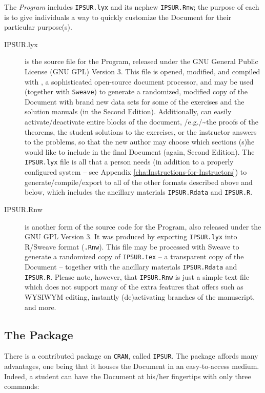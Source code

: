 \documentclass[captions=tableheading]{scrbook}
\begin{document}
The \emph{Program} includes \texttt{IPSUR.lyx} and its nephew \texttt{IPSUR.Rnw}; the purpose of each is to give individuals a way to quickly customize the Document for their particular purpose(s).


\begin{description}
\item[IPSUR.lyx] is the source \LyX{} file for the Program, released under the GNU General Public License (GNU GPL) Version 3. This file is opened, modified, and compiled with \LyX{}, a sophisticated open-source document processor, and may be used (together with \texttt{Sweave}) to generate a randomized, modified copy of the Document with brand new data sets for some of the exercises and the solution manuals (in the Second Edition). Additionally, \LyX{} can easily activate/deactivate entire blocks of the document, /e.g./\~{}the \textsf{proofs} of the theorems, the student \textsf{solutions} to the exercises, or the instructor \textsf{answers} to the problems, so that the new author may choose which sections (s)he would like to include in the final Document (again, Second Edition). The \texttt{IPSUR.lyx} file is all that a person needs (in addition to a properly configured system -- see Appendix \ref{cha:Instructions-for-Instructors}) to generate/compile/export to all of the other formats described above and below, which includes the ancillary materials \texttt{IPSUR.Rdata} and \texttt{IPSUR.R}.
\item[IPSUR.Rnw] is another form of the source code for the Program, also released under the GNU GPL Version 3. It was produced by exporting \texttt{IPSUR.lyx} into\textsf{ R}/Sweave format (\texttt{.Rnw}). This file may be processed with Sweave to generate a randomized copy of \texttt{IPSUR.tex} -- a transparent copy of the Document -- together with the ancillary materials \texttt{IPSUR.Rdata} and \texttt{IPSUR.R}. Please note, however, that \texttt{IPSUR.Rnw} is just a simple text file which does not support many of the extra features that \LyX{} offers such as WYSIWYM editing, instantly (de)activating branches of the manuscript, and more.
\end{description}

\subsection*{The Package}
There is a contributed package on \texttt{CRAN}, called \texttt{IPSUR}. The package affords many advantages, one being that it houses the  Document in an easy-to-access medium. Indeed, a student can have the Document at his/her fingertips with only three commands:
\end{document}
